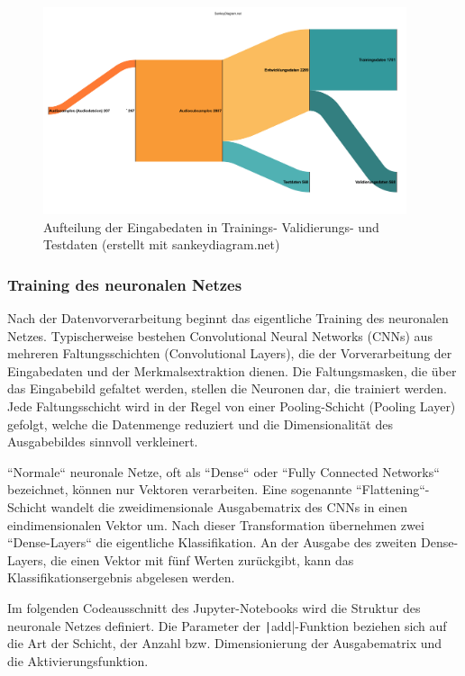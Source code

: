 \begin{figure}[h!]
\centering
\includegraphics[width=0.95\textwidth]{images/08_durchfuehrung/nn/input-data-graph.png}
\caption{Aufteilung der Eingabedaten in Trainings- Validierungs- und Testdaten (erstellt mit sankeydiagram.net)}
\label{fig:img-input-data-graph}
\end{figure}

\subsubsection{Training des neuronalen Netzes}
\label{sec:nn-training-of-nn-jupyter}

Nach der Datenvorverarbeitung beginnt das eigentliche Training des neuronalen Netzes. Typischerweise bestehen Convolutional Neural Networks (CNNs) aus mehreren Faltungsschichten (Convolutional Layers), die der Vorverarbeitung der Eingabedaten und der Merkmalsextraktion dienen. Die Faltungsmasken, die über das Eingabebild gefaltet werden, stellen die Neuronen dar, die trainiert werden. Jede Faltungsschicht wird in der Regel von einer Pooling-Schicht (Pooling Layer) gefolgt, welche die Datenmenge reduziert und die Dimensionalität des Ausgabebildes sinnvoll verkleinert. \cite{how-cnn-work}

``Normale`` neuronale Netze, oft als ``Dense`` oder ``Fully Connected Networks`` bezeichnet, können nur Vektoren verarbeiten. Eine sogenannte ``Flattening``-Schicht wandelt die zweidimensionale Ausgabematrix des CNNs in einen eindimensionalen Vektor um. Nach dieser Transformation übernehmen zwei ``Dense-Layers`` die eigentliche Klassifikation. An der Ausgabe des zweiten Dense-Layers, die einen Vektor mit fünf Werten zurückgibt, kann das Klassifikationsergebnis abgelesen werden. \cite{how-cnn-work}

Im folgenden Codeausschnitt des Jupyter-Notebooks wird die Struktur des neuronale Netzes definiert. Die Parameter der \texttt|add|-Funktion beziehen sich auf die Art der Schicht, der Anzahl bzw. Dimensionierung der Ausgabematrix und die Aktivierungsfunktion.

